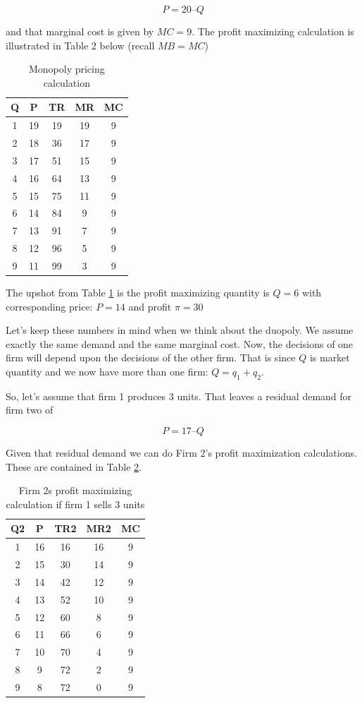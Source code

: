 \documentclass[
]{book}
\begin{document}
\[P = 20 – Q\]

and that marginal cost is given by \(MC = 9\). The profit maximizing calculation is illustrated in Table 2 below (recall \(MB=MC\))

\begin{table}

\caption{\label{tab:oligopoly02}Monopoly pricing calculation}
\centering
\begin{tabular}[t]{c|c|c|c|c}
\hline
Q & P & TR & MR & MC\\
\hline
1 & 19 & 19 & 19 & 9\\
\hline
2 & 18 & 36 & 17 & 9\\
\hline
3 & 17 & 51 & 15 & 9\\
\hline
4 & 16 & 64 & 13 & 9\\
\hline
5 & 15 & 75 & 11 & 9\\
\hline
6 & 14 & 84 & 9 & 9\\
\hline
7 & 13 & 91 & 7 & 9\\
\hline
8 & 12 & 96 & 5 & 9\\
\hline
9 & 11 & 99 & 3 & 9\\
\hline
\end{tabular}
\end{table}

The upshot from Table \ref{tab:oligopoly02} is the profit maximizing quantity is \(Q = 6\) with corresponding price: \(P=14\) and profit \(\pi=30\)

Let's keep these numbers in mind when we think about the duopoly. We assume exactly the same demand and the same marginal cost. Now, the decisions of one firm will depend upon the decisions of the other firm. That is since \(Q\) is market quantity and we now have more than one firm: \(Q=q_1+q_2\).

So, let's assume that firm 1 produces 3 units. That leaves a residual demand for firm two of

\[P = 17 – Q\]

Given that residual demand we can do Firm 2's profit maximization calculations. These are contained in Table \ref{tab:oligopoly03}.

\begin{table}

\caption{\label{tab:oligopoly03}Firm 2s profit maximizing calculation if firm 1 sells 3 units}
\centering
\begin{tabular}[t]{c|c|c|c|c}
\hline
Q2 & P & TR2 & MR2 & MC\\
\hline
1 & 16 & 16 & 16 & 9\\
\hline
2 & 15 & 30 & 14 & 9\\
\hline
3 & 14 & 42 & 12 & 9\\
\hline
4 & 13 & 52 & 10 & 9\\
\hline
5 & 12 & 60 & 8 & 9\\
\hline
6 & 11 & 66 & 6 & 9\\
\hline
7 & 10 & 70 & 4 & 9\\
\hline
8 & 9 & 72 & 2 & 9\\
\hline
9 & 8 & 72 & 0 & 9\\
\hline
\end{tabular}
\end{table}
\end{document}
